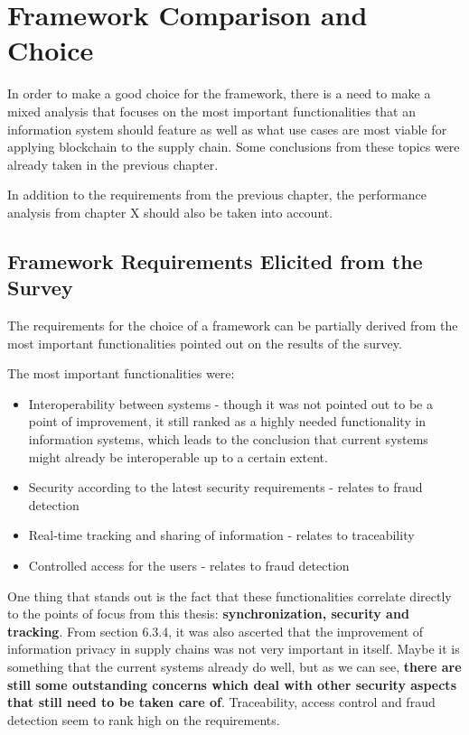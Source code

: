 
\section{Framework Comparison and Choice}

In order to make a good choice for the framework, there is a need to make a mixed analysis that focuses on the most important functionalities that an information system should feature as well as what use cases are most viable for applying blockchain to the supply chain. Some conclusions from these topics were already taken in the previous chapter. %

In addition to the requirements from the previous chapter, the performance analysis from chapter X should also be taken into account. %

\subsection{Framework Requirements Elicited from the Survey}

The requirements for the choice of a framework can be partially derived from the most important functionalities pointed out on the results of the survey.


The most important functionalities were:
\begin{itemize}
	\item Interoperability between systems - though it was not pointed out to be a point of improvement, it still ranked as a highly needed functionality in information systems, which leads to the conclusion that current systems might already be interoperable up to a certain extent.
	\item Security according to the latest security requirements - relates to fraud detection
	\item Real-time tracking and sharing of information - relates to traceability
	\item Controlled access for the users - relates to fraud detection
\end{itemize}


One thing that stands out is the fact that these functionalities correlate directly to the points of focus from this thesis: \textbf{synchronization, security and tracking}.  From section 6.3.4, it was also ascerted that the improvement of information privacy in supply chains was not very important in itself. Maybe it is something that the current systems already do well, but as we can see, \textbf{there are still some outstanding concerns which deal with other security aspects that still need to be taken care of}. Traceability, access control and fraud detection seem to rank high on the requirements.

